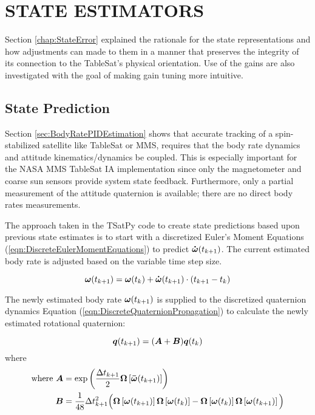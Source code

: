 
\chapter{STATE ESTIMATORS}
\label{chap:Estimators}

Section \ref{chap:StateError} explained the rationale for the state representations and how adjustments can made to them in a manner that preserves the integrity of its connection to the TableSat's physical orientation.  Use of the gains are also investigated with the goal of making gain tuning more intuitive.

\section{State Prediction}
\label{sec:StatePrediction}

Section \ref{sec:BodyRatePIDEstimation} shows that accurate tracking of a spin-stabilized satellite like TableSat or MMS, requires that the body rate dynamics and attitude kinematics/dynamics be coupled.  This is especially important for the NASA MMS TableSat IA implementation since only the magnetometer and coarse sun sensors provide system state feedback.  Furthermore, only a partial measurement of the attitude quaternion is available; there are no direct body rates measurements.

The approach taken in the TSatPy code to create state predictions based upon previous state estimates is to start with a discretized Euler's Moment Equations (\ref{eqn:DiscreteEulerMomentEquations}) to predict $\boldsymbol{\dot{\omega}}(t_{k+1})$.  The current estimated body rate is adjusted based on the variable time step size.

\begin{equation}
  \boldsymbol{\omega}(t_{k+1}) = \boldsymbol{\omega}(t_{k}) + \boldsymbol{\dot{\omega}}(t_{k+1})\cdot (t_{k+1} - t_k)
\end{equation}

The newly estimated body rate $\boldsymbol{\omega}(t_{k+1})$ is supplied to the discretized quaternion dynamics Equation (\ref{eqn:DiscreteQuaternionPropagation}) to calculate the newly estimated rotational quaternion:

\begin{equation}
  \boldsymbol{q}(t_{k+1}) = ( \boldsymbol{A} + \boldsymbol{B} ) \boldsymbol{q}(t_{k}) \\
\end{equation}
where
\begin{equation}
  \begin{aligned}
    \text{where } \boldsymbol{A} &= \exp \left( \frac{\Delta t_{k+1}}{2} \boldsymbol{\Omega} \left[ \boldsymbol{\bar{\omega}}(t_{k+1}) \right] \right)\\
    \boldsymbol{B} &= \frac{1}{48} \Delta t_{k+1}^2 \Big(
    \boldsymbol{\Omega} \left[\boldsymbol{\omega}(t_{k+1}) \right]
    \boldsymbol{\Omega} \left[\boldsymbol{\omega}(t_{k})   \right] -
    \boldsymbol{\Omega} \left[\boldsymbol{\omega}(t_{k})   \right]
    \boldsymbol{\Omega} \left[\boldsymbol{\omega}(t_{k+1}) \right]
      \Big)
  \end{aligned}
\end{equation}


